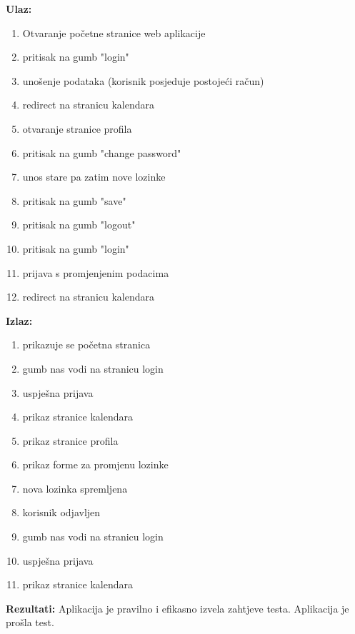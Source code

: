 				\textbf{Ulaz:}
				\begin{enumerate}
					\item Otvaranje početne stranice web aplikacije
					\item pritisak na gumb "login"
					\item unošenje podataka (korisnik posjeduje postojeći račun)
					\item redirect na stranicu kalendara
					\item otvaranje stranice profila
					\item pritisak na gumb "change password"
					\item unos stare pa zatim nove lozinke
					\item pritisak na gumb "save"
					\item pritisak na gumb "logout"
					\item pritisak na gumb "login"
					\item prijava s promjenjenim podacima
					\item redirect na stranicu kalendara
				\end{enumerate}
				\textbf{Izlaz:}
				\begin{enumerate}
					\item prikazuje se početna stranica
					\item gumb nas vodi na stranicu login
					\item uspješna prijava
					\item prikaz stranice kalendara
					\item prikaz stranice profila
					\item prikaz forme za promjenu lozinke
					\item nova lozinka spremljena
					\item korisnik odjavljen
					\item gumb nas vodi na stranicu login
					\item uspješna prijava
					\item prikaz stranice kalendara
				\end{enumerate}
				\textbf{Rezultati:} {Aplikacija je pravilno i efikasno izvela zahtjeve testa. \color{green} Aplikacija je prošla test.}\\\\
				
